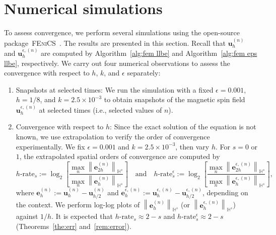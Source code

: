 \documentclass[11pt,reqno]{amsart}
\theoremstyle{definition}
\numberwithin{equation}{section}
\newcommand{\bff}{\boldsymbol}
\newcommand{\bb}{\mathbb}
\newcommand{\norm}[2]{\left\|{#1}\right\|_{#2}}
\begin{document}
\section{Numerical simulations} \label{sec:num sim}

To assess convergence, we perform several simulations using the open-source package~\textsc{FEniCS}~\citep{AlnaesEtal15}. The results are presented in this section. Recall that $\bff{u}_h^{(n)}$ and $\bff{u}_h^{\epsilon, (n)}$ are computed by Algorithm~\ref{alg:fem llbe} and Algorithm~\ref{alg:fem eps llbe}, respectively. We carry out four numerical observations to assess the convergence with respect to $h$, $k$, and $\epsilon$ separately:
{
\begin{enumerate}

\item[(O1)] Snapshots at selected times: We run the simulation with a fixed $\epsilon=0.001$, $h=1/8$, and $k=2.5\times 10^{-3}$ to obtain snapshots of the magnetic spin field $\bff{u}_h^{\epsilon, (n)}$ at selected times (i.e., selected values of $n$).

\item[(O2)] Convergence with respect to $h$:
Since the exact solution of the equation is not known, we use extrapolation to verify the order of convergence experimentally. We fix $\epsilon=0.001$ and $k=2.5\times 10^{-3}$, then vary $h$. For $s=0$ or $1$, the extrapolated spatial orders of convergence are computed by
\begin{equation}\label{equ:hrate}
	h\text{-rate}_s :=  
    \log_2 \left[\frac{\max_n \norm{\bff{e}_{2h}^{(n)}}{\bb{H}^s}}{\max_n \norm{\bff{e}_{h}^{(n)}}{\bb{H}^s}}\right]
    \quad\text{and}\quad
    h\text{-rate}_s^\epsilon :=
    \log_2 \left[\frac{\max_n \norm{\bff{e}_{2h}^{\epsilon, (n)}}{\bb{H}^s}}{\max_n \norm{\bff{e}_{h}^{\epsilon, (n)}}{\bb{H}^s}}\right],
\end{equation}
where
$\bff{e}_h^{(n)} := \bff{u}_{h}^{(n)}-\bff{u}_{h/2}^{(n)}$ and $\bff{e}_h^{\epsilon, (n)} := \bff{u}_{h}^{\epsilon, (n)}-\bff{u}_{h/2}^{\epsilon, (n)}$, depending on the context. We perform log-log plots of $\norm{\bff{e}_h^{(n)}}{\bb{H}^s}$ (or $\norm{\bff{e}_h^{\epsilon, (n)}}{\bb{H}^s}$) against $1/h$.  It is expected that $h\text{-rate}_s \approx 2-s$ and $h\text{-rate}_s^\epsilon \approx 2-s$ (Theorems~\ref{the:err} and~\ref{rem:error}).


\end{enumerate}}
\end{document}
